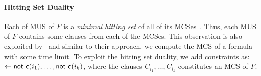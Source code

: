\paragraph{Hitting Set Duality}
Each of MUS of $F$ is a {\em minimal hitting set} of all of its MCSes~\cite{DW1987}\cite{Reiter1987}.
Thus, each MUS of $F$ contains some clauses from each of the MCSes. 
This observation is also exploited by~\cite{BM2021} and similar to their approach, we compute the MCS of a formula with some time limit. 
To exploit the hitting set duality, we add constraints as: $\leftarrow \mathsf{not}\text{ } \mathsf{c}(i_1), \ldots, \mathsf{not}\text{ } \mathsf{c}(i_k)$, 
where the clauses $C_{i_1}, \ldots, C_{i_k}$ constitutes an MCS of $F$.